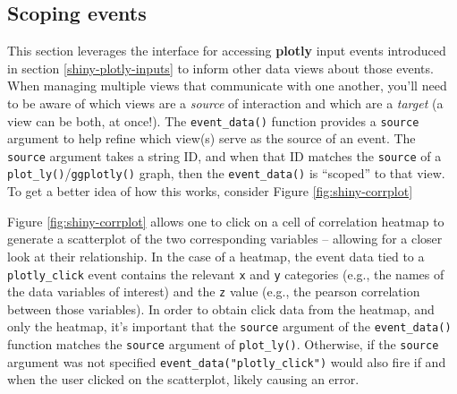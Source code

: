 \documentclass[
  12pt,
]{krantz}
\begin{document}
\hypertarget{scoping-events}{%
\subsection{Scoping events}\label{scoping-events}}

This section leverages the interface for accessing \textbf{plotly} input events introduced in section \ref{shiny-plotly-inputs} to inform other data views about those events. When managing multiple views that communicate with one another, you'll need to be aware of which views are a \emph{source} of interaction and which are a \emph{target} (a view can be both, at once!). The \texttt{event\_data()} function provides a \texttt{source} argument to help refine which view(s) serve as the source of an event. The \texttt{source} argument takes a string ID, and when that ID matches the \texttt{source} of a \texttt{plot\_ly()}/\texttt{ggplotly()} graph, then the \texttt{event\_data()} is ``scoped'' to that view. To get a better idea of how this works, consider Figure \ref{fig:shiny-corrplot}

Figure \ref{fig:shiny-corrplot} allows one to click on a cell of correlation heatmap to generate a scatterplot of the two corresponding variables -- allowing for a closer look at their relationship. In the case of a heatmap, the event data tied to a \texttt{plotly\_click} event contains the relevant \texttt{x} and \texttt{y} categories (e.g., the names of the data variables of interest) and the \texttt{z} value (e.g., the pearson correlation between those variables). In order to obtain click data from the heatmap, and only the heatmap, it's important that the \texttt{source} argument of the \texttt{event\_data()} function matches the \texttt{source} argument of \texttt{plot\_ly()}. Otherwise, if the \texttt{source} argument was not specified \texttt{event\_data("plotly\_click")} would also fire if and when the user clicked on the scatterplot, likely causing an error.
\end{document}
